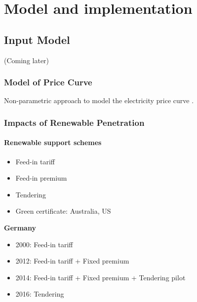 \chapter{Model and implementation}
\label{ch:model}
%

\section{Input Model}

(Coming later)
 
 \subsection{Model of Price Curve}
 Non-parametric approach to model the electricity price curve \cite{Electricity-price-curve}.
 \subsection{Impacts of Renewable Penetration}
 \subsubsection{Renewable support schemes}
 \begin{itemize}
 	\item Feed-in tariff
 	\item Feed-in premium
 	\item Tendering
 	\item Green certificate: Australia, US
 \end{itemize}
 \textbf{Germany}
 \begin{itemize}
 	\item 2000: Feed-in tariff
 	\item 2012: Feed-in tariff + Fixed premium
 	\item 2014: Feed-in tariff + Fixed premium + Tendering pilot
 	\item 2016: Tendering
 \end{itemize}
 \newpage
 
